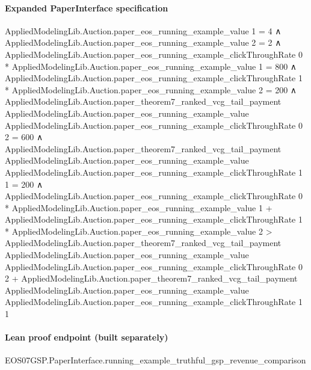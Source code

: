 \documentclass[10pt]{article}
\begin{document}
\paragraph{Expanded PaperInterface specification}
\begin{ReviewVerbatim}
AppliedModelingLib.Auction.paper_eos_running_example_value 1 = 4 ∧
  AppliedModelingLib.Auction.paper_eos_running_example_value 2 = 2 ∧
    AppliedModelingLib.Auction.paper_eos_running_example_clickThroughRate 0 *
          AppliedModelingLib.Auction.paper_eos_running_example_value 1 =
        800 ∧
      AppliedModelingLib.Auction.paper_eos_running_example_clickThroughRate 1 *
            AppliedModelingLib.Auction.paper_eos_running_example_value 2 =
          200 ∧
        AppliedModelingLib.Auction.paper_theorem7_ranked_vcg_tail_payment
              AppliedModelingLib.Auction.paper_eos_running_example_value
              AppliedModelingLib.Auction.paper_eos_running_example_clickThroughRate 0 2 =
            600 ∧
          AppliedModelingLib.Auction.paper_theorem7_ranked_vcg_tail_payment
                AppliedModelingLib.Auction.paper_eos_running_example_value
                AppliedModelingLib.Auction.paper_eos_running_example_clickThroughRate 1 1 =
              200 ∧
            AppliedModelingLib.Auction.paper_eos_running_example_clickThroughRate 0 *
                  AppliedModelingLib.Auction.paper_eos_running_example_value 1 +
                AppliedModelingLib.Auction.paper_eos_running_example_clickThroughRate 1 *
                  AppliedModelingLib.Auction.paper_eos_running_example_value 2 >
              AppliedModelingLib.Auction.paper_theorem7_ranked_vcg_tail_payment
                  AppliedModelingLib.Auction.paper_eos_running_example_value
                  AppliedModelingLib.Auction.paper_eos_running_example_clickThroughRate 0 2 +
                AppliedModelingLib.Auction.paper_theorem7_ranked_vcg_tail_payment
                  AppliedModelingLib.Auction.paper_eos_running_example_value
                  AppliedModelingLib.Auction.paper_eos_running_example_clickThroughRate 1 1
\end{ReviewVerbatim}



\paragraph{Lean proof endpoint (built separately)}\begin{ReviewVerbatim}
EOS07GSP.PaperInterface.running_example_truthful_gsp_revenue_comparison
\end{ReviewVerbatim}
\end{document}
